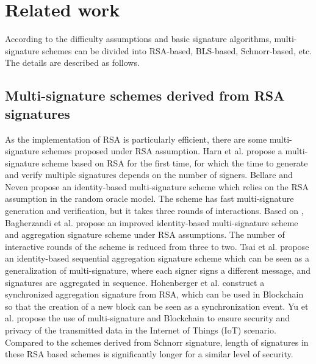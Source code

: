 \documentclass[journal]{IEEEtran}
\begin{document}

\vspace{-2mm}
\section{Related work}
According to the difficulty assumptions and basic signature algorithms, multi-signature schemes can be divided into RSA-based, BLS-based, Schnorr-based, etc. The details are described as follows.
\subsection{Multi-signature schemes derived from RSA signatures}
As the implementation of RSA is particularly efficient, there are some multi-signature schemes proposed under RSA assumption.
Harn et al. \cite{1989New} propose a multi-signature scheme based on RSA for the first time, for which the time to generate and verify multiple signatures depends on the number of signers.
Bellare and Neven \cite{DBLP:conf/ctrsa/BellareN07} propose an identity-based multi-signature scheme which relies on the RSA assumption in the random oracle model. The scheme has fast multi-signature generation and verification, but it takes three rounds of interactions.
Based on \cite{DBLP:conf/ctrsa/BellareN07}, Bagherzandi et al. \cite{DBLP:conf/pkc/BagherzandiJ10} propose an improved identity-based multi-signature scheme and aggregation signature scheme under RSA assumptions. The number of interactive rounds of the scheme is reduced from three to two.
Tsai et al. \cite{DBLP:conf/isbast/TsaiLW13} propose an identity-based sequential aggregation signature scheme which can be seen as a generalization of multi-signature, where each signer signs a different message, and signatures are aggregated in sequence.
Hohenberger et al. \cite{DBLP:conf/eurocrypt/HohenbergerW18} construct a synchronized aggregation signature from RSA, which can be used in Blockchain so that the creation of a new block can be seen as a synchronization event.
Yu et al. \cite{44DBLP:journals/ijdsn/YuZWGXD0Y18} propose the use of multi-signature and Blockchain to ensure security and privacy of the transmitted data in the Internet of Things (IoT) scenario.
Compared to the schemes derived from Schnorr signature, length of signatures in these RSA based schemes is significantly longer for a similar level of security.
\end{document}
